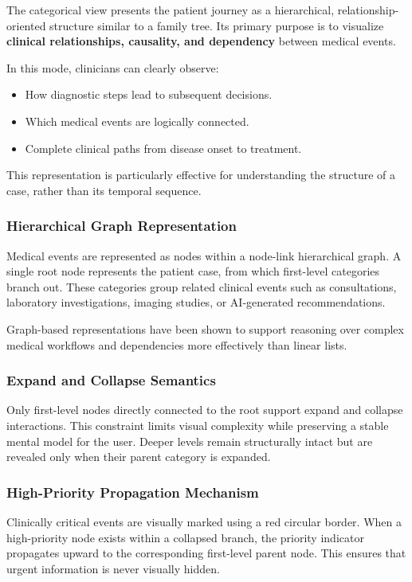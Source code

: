 \documentclass{article}
\begin{document}
The categorical view presents the patient journey as a hierarchical,
relationship-oriented structure similar to a family tree. Its primary purpose
is to visualize \textbf{clinical relationships, causality, and dependency}
between medical events.

In this mode, clinicians can clearly observe:
\begin{itemize}
    \item How diagnostic steps lead to subsequent decisions.
    \item Which medical events are logically connected.
    \item Complete clinical paths from disease onset to treatment.
\end{itemize}

This representation is particularly effective for understanding the structure
of a case, rather than its temporal sequence.

\subsubsection{Hierarchical Graph Representation}

Medical events are represented as nodes within a node-link hierarchical graph.
A single root node represents the patient case, from which first-level
categories branch out. These categories group related clinical events such as
consultations, laboratory investigations, imaging studies, or AI-generated
recommendations.

Graph-based representations have been shown to support reasoning over complex
medical workflows and dependencies more effectively than linear lists.

\subsubsection{Expand and Collapse Semantics}

Only first-level nodes directly connected to the root support expand and
collapse interactions. This constraint limits visual complexity while
preserving a stable mental model for the user. Deeper levels remain
structurally intact but are revealed only when their parent category is
expanded.

\subsubsection{High-Priority Propagation Mechanism}

Clinically critical events are visually marked using a red circular border.
When a high-priority node exists within a collapsed branch, the priority
indicator propagates upward to the corresponding first-level parent node. This
ensures that urgent information is never visually hidden.
\end{document}
